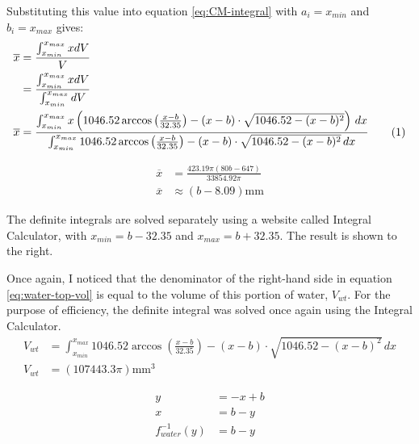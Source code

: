 \documentclass[11pt]{article}
\newcommand{\numberthis}{\addtocounter{equation}{1}\tag{\theequation}}
\begin{document}
    Substituting this value into equation \eqref{eq:CM-integral} with $a_i = x_{min}$ and $b_i = x_{max}$ gives:
    {\footnotesize\begin{align*}
        \overline{x} &= \frac{\int_{x_{min}}^{x_{max}} x dV}{V} \\
        &= \frac{\int_{x_{min}}^{x_{max}} x dV}{\int_{x_{min}}^{x_{max}} dV} \\
        \overline{x} &= \frac{\int_{x_{min}}^{x_{max}} x \left( 1046.52 \arccos{\left( \frac{x - b}{32.35} \right)} - (x - b) \cdot \sqrt{1046.52 - (x - b)^2} \right) \, dx}{\int_{x_{min}}^{x_{max}} 1046.52 \arccos{\left( \frac{x - b}{32.35} \right)} - (x - b) \cdot \sqrt{1046.52 - (x - b)^2} \, dx} \numberthis{\label{eq:water-top-vol}} \\
    \end{align*}}
    \vspace{-50pt}

    \begin{figure}
        \vspace{-25pt}
        {\footnotesize\begin{align*}
            \overline{x} &= \frac{423.19 \pi (80b - 647)}{33854.92 \pi} \\
            \overline{x} &\approx (b - 8.09) \mathrm{mm}
        \end{align*}}
    \end{figure}

    The definite integrals are solved separately using a website called Integral Calculator, with ${x_{min} = b - 32.35}$ and $x_{max} = b + 32.35$. The result is shown to the right.

    Once again, I noticed that the denominator of the right-hand side in equation \eqref{eq:water-top-vol} is equal to the volume of this portion of water, $V_{wt}$. For the purpose of efficiency, the definite integral was solved once again using the Integral Calculator.
    {\footnotesize\begin{align*}
        V_{wt} &= \int_{x_{min}}^{x_{max}} 1046.52 \arccos{\left( \frac{x - b}{32.35} \right)} - (x - b) \cdot \sqrt{1046.52 - (x - b)^2} \, dx \\
        V_{wt} &= (107443.3 \pi) \mathrm{mm}^3
    \end{align*}}

    \begin{figure}
        \vspace{-30pt}
        {\footnotesize\begin{align*}
            y &= -x + b \\
            x &= b - y \\
            f^{-1}_{water}(y) &= b - y
        \end{align*}}
    \end{figure}
\end{document}
